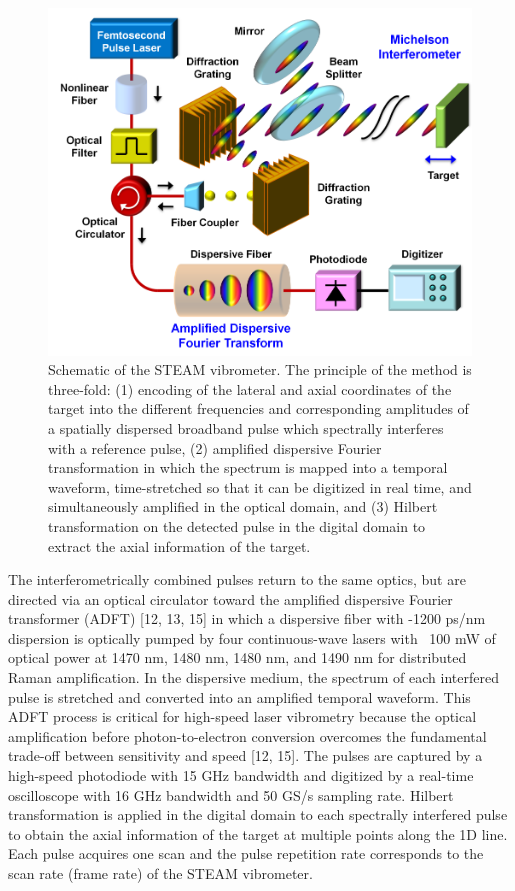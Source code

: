 \begin{figure}[htb!]
\centering
\includegraphics[scale=1]{APL_2011/Figure1.png}
\caption{Schematic of the STEAM vibrometer. The principle of the method is three-fold: (1) encoding of the lateral and axial coordinates of the target into the different frequencies and corresponding amplitudes of a spatially dispersed broadband pulse which spectrally interferes with a reference pulse, (2) amplified dispersive Fourier transformation in which the spectrum is mapped into a temporal waveform, time-stretched so that it can be digitized in real time, and simultaneously amplified in the optical domain, and (3) Hilbert transformation on the detected pulse in the digital domain to extract the axial information of the target.}
\label{fig:APL_2011_Figure1}
\end{figure}

The interferometrically combined pulses return to the same optics, but are directed via an optical circulator toward the amplified dispersive Fourier transformer (ADFT) [12, 13, 15] in which a dispersive fiber with -1200 ps/nm dispersion is optically pumped by four continuous-wave lasers with ~100 mW of optical power at 1470 nm, 1480 nm, 1480 nm, and 1490 nm for distributed Raman amplification. In the dispersive medium, the spectrum of each interfered pulse is stretched and converted into an amplified temporal waveform. This ADFT process is critical for high-speed laser vibrometry because the optical amplification before photon-to-electron conversion overcomes the fundamental trade-off between sensitivity and speed [12, 15]. The pulses are captured by a high-speed photodiode with 15 GHz bandwidth and digitized by a real-time oscilloscope with 16 GHz bandwidth and 50 GS/s sampling rate. Hilbert transformation is applied in the digital domain to each spectrally interfered pulse to obtain the axial information of the target at multiple points along the 1D line. Each pulse acquires one scan and the pulse repetition rate corresponds to the scan rate (frame rate) of the STEAM vibrometer.

